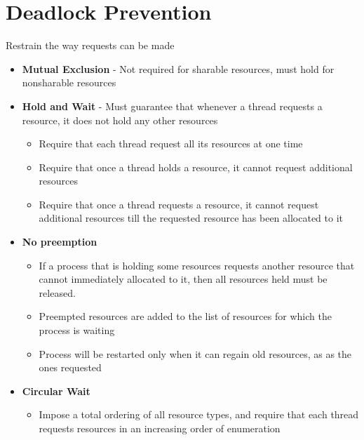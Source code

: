 \documentclass{book/custombook}
\begin{document}
        \section{Deadlock Prevention}
            Restrain the way requests can be made
            \begin{itemize}
                \item \textbf{Mutual Exclusion} - Not required for sharable resources, must hold for nonsharable
                resources
                \item \textbf{Hold and Wait} - Must guarantee that whenever a thread requests a resource, it does
                not hold any other resources
                    \begin{itemize}
                        \item Require that each thread request all its resources at one time
                        \item Require that once a thread holds a resource, it cannot request additional resources
                        \item Require that once a thread requests a resource, it cannot request additional resources
                        till the requested resource has been allocated to it
                    \end{itemize}
                \item \textbf{No preemption}
                    \begin{itemize}
                        \item If a process that is holding some resources requests another resource that cannot immediately
                        allocated to it, then all resources held must be released.
                        \item Preempted resources are added to the list of resources for which the process is waiting
                        \item Process will be restarted only when it can regain old resources, as as the ones requested
                    \end{itemize}
                \item \textbf{Circular Wait}
                    \begin{itemize}
                        \item Impose a total ordering of all resource types, and require that each thread requests resources
                        in an increasing order of enumeration
                    \end{itemize}
            \end{itemize}
\end{document}
